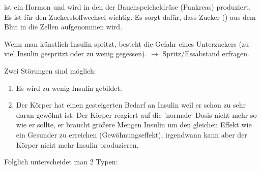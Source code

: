 {
  ist ein Hormon und wird in den 
der Bauchspeicheldrüse (Pankreas) produziert. Es ist für
den Zuckerstoffwechsel wichtig. Es sorgt dafür, dass Zucker
() aus dem Blut in die Zellen aufgenommen wird.



Wenn man künstlich Insulin spritzt, besteht die Gefahr eines
Unterzuckers (zu viel Insulin gespritzt oder zu wenig
gegessen). ${\rightarrow}$  Spritz/Essabstand
er\-fra\-gen.
}{

}{}{}{}




Zwei Störungen sind möglich:

\begin{enumerate}
  \item Es wird zu wenig Insulin gebildet.
  \item Der Körper hat einen gesteigerten Bedarf an Insulin weil er schon
  zu sehr daran gewöhnt ist. Der Körper reagiert auf die 'normale' Dosis
  nicht mehr so wie er sollte, er braucht größere Mengen Insulin um
  den gleichen Effekt wie ein Gesunder zu erreichen (Gewöhnungseffekt),
  irgendwann kann aber der Körper nicht mehr Insulin produzieren.
\end{enumerate}

Folglich unterscheidet man 2 Typen:




